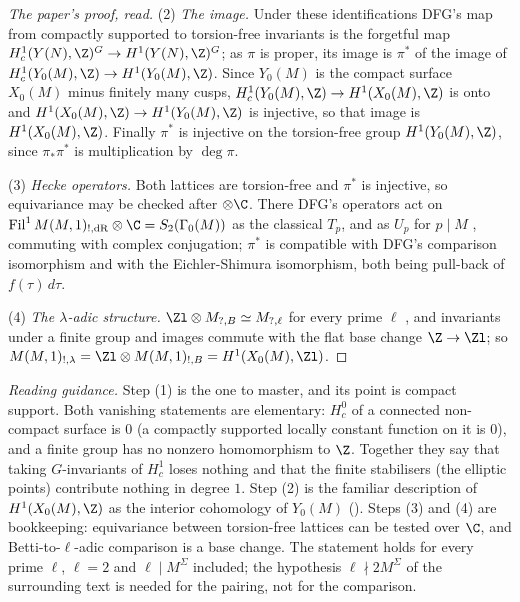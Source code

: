 \begin{sloppypar}
\begin{proof}[The paper's proof, read]
(2) \emph{The image.} Under these identifications DFG's map from compactly supported to torsion-free invariants is the forgetful map $H^1_c(Y(N),\Z)^G\to H^1(Y(N),\Z)^G$; as $\pi$ is
proper, its image is $\pi^*$ of the image of $H^1_c(Y_0(M),\Z)\to H^1(Y_0(M),\Z)$. Since $Y_0(M)$ is the compact surface $X_0(M)$ minus finitely many cusps, $H^1_c(Y_0(M),\Z)\to H^1(X_0(M),\Z)$ is
onto and $H^1(X_0(M),\Z)\to H^1(Y_0(M),\Z)$ is injective, so that image is $H^1(X_0(M),\Z)$. Finally $\pi^*$ is injective on the torsion-free group $H^1(Y_0(M),\Z)$, since $\pi_*\pi^*$ is
multiplication by $\deg\pi$.

(3) \emph{Hecke operators.} Both lattices are torsion-free and $\pi^*$ is injective, so equivariance may be checked after $\otimes\C$. There DFG's operators act on
$\operatorname{Fil}^1M(M,1)_{!,\mathrm{dR}}\otimes\C=S_2(\Gamma_0(M))$ as the classical $T_p$, and as $U_p$ for $p\mid M$ \cite[Proposition 1.3]{DFG04}, commuting with complex conjugation; $\pi^*$ is
compatible with DFG's comparison isomorphism and with the Eichler-Shimura isomorphism, both being pull-back of $f(\tau)\,d\tau$.

(4) \emph{The $\lambda$-adic structure.} $\Zl\otimes M_{?,B}\simeq M_{?,\ell}$ for every prime $\ell$ \cite[Section 1.2.3]{DFG04}, and invariants under a finite group and images commute
with the flat base change $\Z\to\Zl$; so $M(M,1)_{!,\lambda}=\Zl\otimes M(M,1)_{!,B}=H^1(X_0(M),\Zl)$.
\end{proof}

\noindent\emph{Reading guidance.} Step (1) is the one to master, and its point is compact support. Both vanishing statements are elementary: $H^0_c$ of a connected
non-compact surface is $0$ (a compactly supported locally constant function on it is $0$), and a finite group has no nonzero homomorphism to $\Z$. Together they say that
taking $G$-invariants of $H^1_c$ loses nothing and that the finite stabilisers (the elliptic points) contribute nothing in degree $1$. Step (2) is the familiar
description of $H^1(X_0(M),\Z)$ as the interior cohomology of $Y_0(M)$ (). Steps (3) and (4) are bookkeeping: equivariance between torsion-free lattices can
be tested over $\C$, and Betti-to-$\ell$-adic comparison is a base change. The statement holds for every prime $\ell$, $\ell=2$ and $\ell\mid M^\Sigma$ included; the
hypothesis $\ell\nmid2M^\Sigma$ of the surrounding text is needed for the pairing, not for the comparison.


\end{sloppypar}
